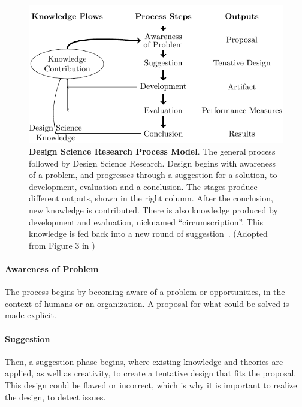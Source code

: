 \begin{figure}[htbp]  %
  \centering
  \includegraphics[width=\textwidth]{figures/dsrm-flow.pdf}
  \caption[Design Science Research Process Model]{\textbf{Design Science Research Process Model}. The general process followed by Design Science Research. Design begins with awareness of a problem, and progresses through a suggestion for a solution, to development, evaluation and a conclusion.
  The stages produce different outputs, shown in the right column.
  After the conclusion, new knowledge is contributed.
  There is also knowledge produced by development and evaluation, nicknamed ``circumscription''.
  This knowledge is fed back into a new round of suggestion~\cite[p.~11-13]{vijayvaishnaviDesignScienceResearch2019}.
  (Adopted from Figure 3 in \textcite[p.~11]{vijayvaishnaviDesignScienceResearch2019})}\label{fig:dsrpm}
\end{figure}


\paragraph{Awareness of Problem}
The process begins by becoming aware of a problem or opportunities, in the context of humans or an organization.
A proposal for what could be solved is made explicit.


\paragraph{Suggestion}
Then, a suggestion phase begins, where existing knowledge and theories are applied, as well as creativity, to create a tentative design that fits the proposal.
This design could be flawed or incorrect, which is why it is important to realize the design, to detect issues.


